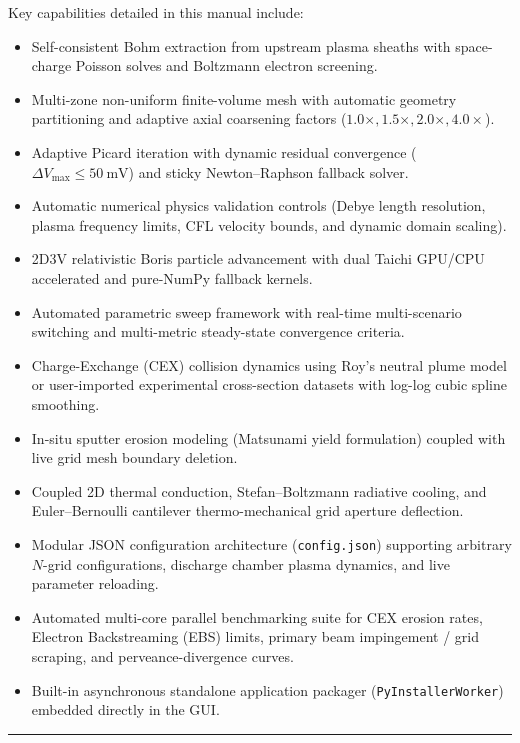 \documentclass[11pt,a4paper]{article}
\begin{document}
Key capabilities detailed in this manual include:
\begin{itemize}[nosep]
    \item Self-consistent Bohm extraction from upstream plasma sheaths with space-charge Poisson solves and Boltzmann electron screening.
    \item Multi-zone non-uniform finite-volume mesh with automatic geometry partitioning and adaptive axial coarsening factors ($1.0\times, 1.5\times, 2.0\times, 4.0\times$).
    \item Adaptive Picard iteration with dynamic residual convergence ($\Delta V_{\max} \le \SI{50}{\milli\volt}$) and sticky Newton--Raphson fallback solver.
    \item Automatic numerical physics validation controls (Debye length resolution, plasma frequency limits, CFL velocity bounds, and dynamic domain scaling).
    \item 2D3V relativistic Boris particle advancement with dual Taichi GPU/CPU accelerated and pure-NumPy fallback kernels.
    \item Automated parametric sweep framework with real-time multi-scenario switching and multi-metric steady-state convergence criteria.
    \item Charge-Exchange (CEX) collision dynamics using Roy's neutral plume model or user-imported experimental cross-section datasets with log-log cubic spline smoothing.
    \item In-situ sputter erosion modeling (Matsunami yield formulation) coupled with live grid mesh boundary deletion.
    \item Coupled 2D thermal conduction, Stefan--Boltzmann radiative cooling, and Euler--Bernoulli cantilever thermo-mechanical grid aperture deflection.
    \item Modular JSON configuration architecture (\texttt{config.json}) supporting arbitrary $N$-grid configurations, discharge chamber plasma dynamics, and live parameter reloading.
    \item Automated multi-core parallel benchmarking suite for CEX erosion rates, Electron Backstreaming (EBS) limits, primary beam impingement / grid scraping, and perveance-divergence curves.
    \item Built-in asynchronous standalone application packager (\texttt{PyInstallerWorker}) embedded directly in the GUI.
\end{itemize}

\vspace{1em}
\hrule
\vspace{1em}
\end{document}

